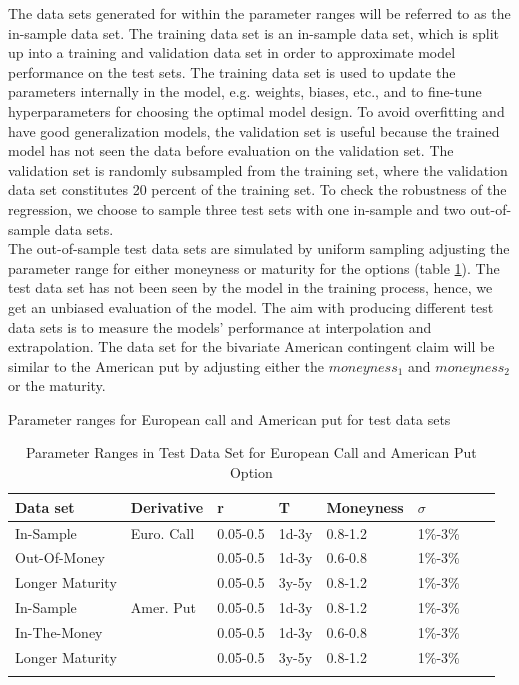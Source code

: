 The data sets generated for within the parameter ranges will be referred to as the in-sample data set. The training data set is an in-sample data set, which is split up into a training and validation data set in order to approximate model performance on the test sets. The training data set is used to update the parameters internally in the model, e.g. weights, biases, etc., and to fine-tune hyperparameters for choosing the optimal model design. To avoid overfitting and have good generalization models, the validation set is useful because the trained model has not seen the data before evaluation on the validation set. The validation set is randomly subsampled from the training set, where the validation data set constitutes 20 percent of the training set. To check the robustness of the regression, we choose to sample three test sets with one in-sample and two out-of-sample data sets. \\

The out-of-sample test data sets are simulated by uniform sampling adjusting the parameter range for either moneyness or maturity for the options (table \ref{tab:totalVanillaParRange}). The test data set has not been seen by the model in the training process, hence, we get an unbiased evaluation of the model. The aim with producing different test data sets is to measure the models' performance at interpolation and extrapolation. The data set for the bivariate American contingent claim will be similar to the American put by adjusting either the $moneyness_1$ and $moneyness_2$ or the maturity.\\

\begin{table}[th]
\caption{Parameter Ranges in Test Data Set for European Call and American Put Option}{Parameter ranges for European call and American put for test data sets}
\label{tab:totalVanillaParRange}
\centering
\begin{tabular}{l l l l l l l l }
\toprule
\textbf{Data set} & Derivative  & \textbf{r} & \textbf{T} & \textbf{Moneyness} & \textbf{$\sigma$} \\
\midrule
In-Sample & Euro. Call & 0.05-0.5 & 1d-3y & 0.8-1.2 & 1\%-3\%\\ 
Out-Of-Money & & 0.05-0.5 & 1d-3y & 0.6-0.8 & 1\%-3\%\\
Longer Maturity & & 0.05-0.5 & 3y-5y & 0.8-1.2 & 1\%-3\%\\
In-Sample & Amer. Put & 0.05-0.5 & 1d-3y & 0.8-1.2 & 1\%-3\%\\ 
In-The-Money & & 0.05-0.5 & 1d-3y & 0.6-0.8 & 1\%-3\%\\
Longer Maturity & & 0.05-0.5 & 3y-5y & 0.8-1.2 & 1\%-3\%\\
\bottomrule\\
\end{tabular}
\end{table}

